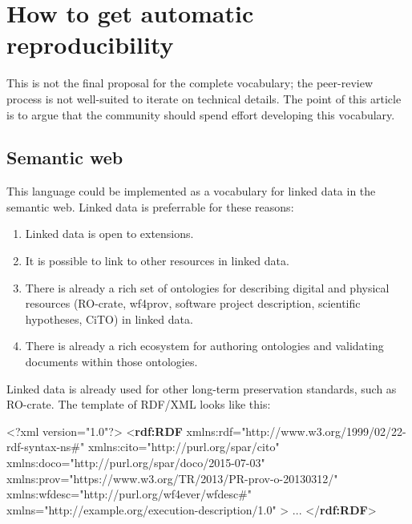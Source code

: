 \documentclass[manuscript,authordraft]{acmart}
\newenvironment{Shaded}{}{}
\newcommand{\FunctionTok}[1]{\textcolor[rgb]{0.02,0.16,0.49}{#1}}
\newcommand{\KeywordTok}[1]{\textcolor[rgb]{0.00,0.44,0.13}{\textbf{#1}}}
\newcommand{\NormalTok}[1]{#1}
\newcommand{\OtherTok}[1]{\textcolor[rgb]{0.00,0.44,0.13}{#1}}
\newcommand{\StringTok}[1]{\textcolor[rgb]{0.25,0.44,0.63}{#1}}
\providecommand{\tightlist}{\setlength{\itemsep}{0pt}\setlength{\parskip}{0pt}}
\begin{document}
\hypertarget{how-to-get-automatic-reproducibility}{%
\section{How to get automatic
reproducibility}\label{how-to-get-automatic-reproducibility}}

This is not the final proposal for the complete vocabulary; the
peer-review process is not well-suited to iterate on technical details.
The point of this article is to argue that the community should spend
effort developing this vocabulary.

\hypertarget{semantic-web}{%
\subsection{Semantic web}\label{semantic-web}}

This language could be implemented as a vocabulary for linked data in
the semantic web. Linked data is preferrable for these reasons:

\begin{enumerate}
\def\labelenumi{\arabic{enumi}.}
\tightlist
\item
  Linked data is open to extensions.
\item
  It is possible to link to other resources in linked data.
\item
  There is already a rich set of ontologies for describing digital and
  physical resources (RO-crate, wf4prov, software project description,
  scientific hypotheses, CiTO) in linked data.
\item
  There is already a rich ecosystem for authoring ontologies and
  validating documents within those ontologies.
\end{enumerate}

Linked data is already used for other long-term preservation standards,
such as RO-crate. The template of RDF/XML looks like this:

\small

\begin{Shaded}
\begin{Highlighting}[]
\FunctionTok{\textless{}?xml}\OtherTok{ version=}\StringTok{"1.0"}\FunctionTok{?\textgreater{}}
\NormalTok{\textless{}}\KeywordTok{rdf:RDF}\OtherTok{ xmlns:rdf=}\StringTok{"http://www.w3.org/1999/02/22{-}rdf{-}syntax{-}ns\#"}
\OtherTok{         xmlns:cito=}\StringTok{"http://purl.org/spar/cito"}
\OtherTok{         xmlns:doco=}\StringTok{"http://purl.org/spar/doco/2015{-}07{-}03"}
\OtherTok{         xmlns:prov=}\StringTok{"https://www.w3.org/TR/2013/PR{-}prov{-}o{-}20130312/"}
\OtherTok{         xmlns:wfdesc=}\StringTok{"http://purl.org/wf4ever/wfdesc\#"}
\OtherTok{         xmlns=}\StringTok{"http://example.org/execution{-}description/1.0"}\NormalTok{ \textgreater{}}
\NormalTok{...}
\NormalTok{\textless{}/}\KeywordTok{rdf:RDF}\NormalTok{\textgreater{}}
\end{Highlighting}
\end{Shaded}
\end{document}
